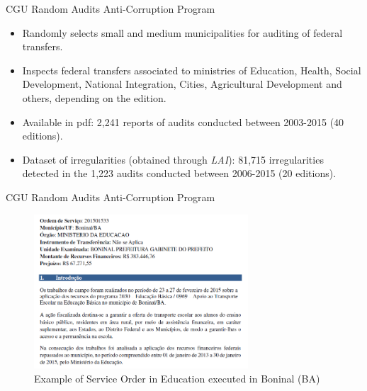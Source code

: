 \documentclass[handout,t,usenames,dvipsnames]{beamer}
\begin{document}
\begin{frame}{CGU Random Audits Anti-Corruption Program}
\vspace{1em}

\begin{itemize}
\item Randomly selects small and medium municipalities for auditing of federal transfers.
\vspace{1em}

\item Inspects federal transfers associated to ministries of Education, Health, Social Development, National Integration, Cities, Agricultural Development and others, depending on the edition.
\vspace{1em}

\item Available in pdf: 2,241 reports of audits conducted between 2003-2015  (40 editions).
\vspace{1em}

\item Dataset of irregularities (obtained through \textit{LAI}): 81,715 irregularities detected in the 1,223 audits conducted between 2006-2015 (20 editions).
\end{itemize}

\end{frame}

\begin{frame}{CGU Random Audits Anti-Corruption Program}
\begin{figure}[h!]
\includegraphics[width=8cm]{ex_OS.png}
\centering
\caption{\small Example of Service Order in Education executed in Boninal (BA)}
\end{figure}
\end{frame}
\end{document}
